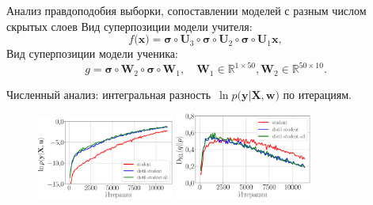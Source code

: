 \documentclass[10pt,pdf,hyperref={unicode}]{beamer}
\begin{document}

\begin{frame}{Анализ правдоподобия выборки, сопоставлении моделей с разным числом скрытых слоев}
\justifying
Вид суперпозиции модели учителя:
$$
f\bigr(\textbf{x}\bigr) = \bm{\sigma} \circ \textbf{U}_3\circ \bm{\sigma} \circ \textbf{U}_2\circ\bm{\sigma}\circ \textbf{U}_1\textbf{x},
$$
Вид суперпозиции модели ученика:
$$
g = \bm{\sigma} \circ \textbf{W}_2 \circ \bm{\sigma} \circ \textbf{W}_1, \quad \textbf{W}_{1} \in \mathbb{R}^{1 \times 50}, \textbf{W}_{2} \in \mathbb{R}^{50 \times 10}.
$$
\begin{table}[]
\begin{center}
\end{center}
\end{table}

Численный анализ: интегральная разность~$\ln p\bigr(\textbf{y}|\textbf{X}, \textbf{w}\bigr)$ по итерациям.

\begin{figure}[h!]
\includegraphics[width=0.4\textwidth]{figures/synthetic_likelihood_2_layers.eps}
\includegraphics[width=0.4\textwidth]{figures/synthetic_D_KL_2_layers.eps}
\end{figure}

\end{frame}
\end{document}
